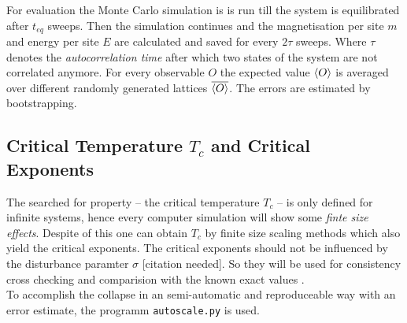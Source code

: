     For evaluation the Monte Carlo simulation is is run till the system
    is equilibrated after \(t_{eq}\) sweeps. Then the simulation continues
    and the magnetisation per site \(m\) and energy per site \(E\)
    are calculated and saved for every \(2\tau\) sweeps. Where \(\tau\)
    denotes the \emph{autocorrelation time} after which two states of
    the system are not correlated anymore.
    For every observable \(O\) the expected value \(\left< O \right>\) is averaged
    over different randomly generated lattices \(\overline{\left< O \right>}\). The
    errors are estimated by bootstrapping.

\subsection{Critical Temperature $T_c$ and Critical Exponents}
\label{ssec:finitesize}
    The searched for property -- the critical temperature \(T_c\)
    -- is only defined for infinite systems, hence every computer
    simulation will show some \emph{finte size effects}.
    Despite of this one can obtain \(T_c\) by finite size scaling
    methods \cite[S. ??]{NewmanBarkema1999} which also yield the critical
    exponents. The critical exponents should not be influenced by the
    disturbance paramter \(\sigma\) [citation needed]. So they will be
    used for consistency cross checking and comparision with the known
    exact values \cite[S. 59]{Pelissetto2002}.\\
    To accomplish the collapse in an semi-automatic and reproduceable
    way with an error estimate, the programm
    \texttt{autoscale.py} \cite{autoscale2009} is used.

